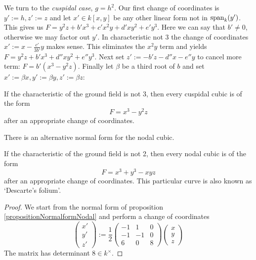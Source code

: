 We turn to the \emph{cuspidal case}, $g = h^2$.
Our first change of coordinates is $y' := h, z' := z$ and let $x' \in k[x,y]$ be any other linear form not in ${\operatorname{span}}_k(y')$.
This gives us $F = y^2z + b'x^3 + c'x^2y + d'xy^2 + e'y^3$.
Here we can say that $b' \neq 0$, otherwise we may factor out $y'$.
In characteristic not 3 the change of coordinates $x' := x - \frac{c'}{3b'}y$ makes sense.
This eliminates the $x^2y$ term and yields $F = y^2z + b'x^3 +  d''xy^2 + e''y^3$.
Next set $z' := -b'z -d''x -e''y$ to cancel more term: $F = b'(x^3 - y^2z)$.
Finally let $\beta$ be a third root of $b$ and set $x' := \beta x, y' := \beta y, z' := \beta z$:
\begin{proposition} \label{propositionNormalformCuspidal}
If the characteristic of the ground field is not 3, then every cuspidal cubic is of the form
\begin{equation}
F = x^3 - y^2z
\end{equation}
after an appropriate change of coordinates.
\end{proposition}

There is an alternative normal form for the nodal cubic.

\begin{proposition} \label{propositionNormalformNodal2}
If the characteristic of the ground field is not 2, then every nodal cubic is of the form
\begin{equation}
F = x^3 + y^3 - xyz
\end{equation}
after an appropriate change of coordinates.
This particular curve is also known as `Descarte's folium'.
\end{proposition}

\begin{proof}
We start from the normal form of proposition \ref{propositionNormalformNodal} and perform a change of coordinates
\begin{equation}
\begin{pmatrix} x' \\ y' \\ z' \end{pmatrix}
:=
\frac 12
\begin{pmatrix}
-1 & 1 & 0 \\
-1 & -1 & 0 \\
6 & 0 & 8
\end{pmatrix}
\begin{pmatrix} x \\ y \\ z \end{pmatrix}
\end{equation}
The matrix has determinant $8 \in k^\times$.
\end{proof}
